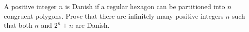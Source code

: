 A positive integer $n$ is Danish if a regular hexagon can be partitioned into $n$ congruent polygons. Prove that there are infinitely many positive integers $n$ such that both $n$ and $2^n+n$ are Danish.